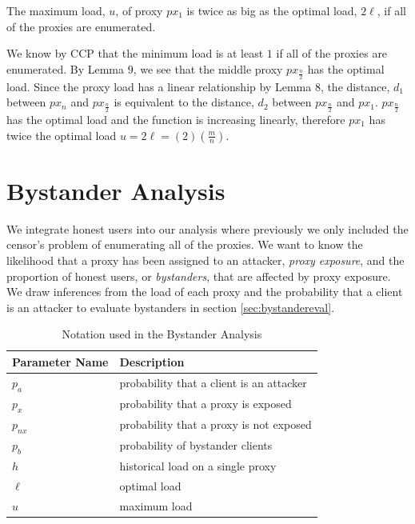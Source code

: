 \begin{theorem}{The maximum load, $u$, of proxy $px_1$ is twice as big as the optimal load, $2\ell$, if all of the proxies are enumerated.}

We know by CCP that the minimum load is at least $1$ if all of the proxies are enumerated. By Lemma $9$, we see that the middle proxy $px_{\frac{n}{2}}$ has the optimal load. Since the proxy load has a linear relationship by Lemma $8$, the distance, $d_1$ between $px_n$ and $px_{\frac{n}{2}}$ is equivalent to the distance, $d_2$ between $px_{\frac{n}{2}}$ and $px_1$. $px_{\frac{n}{2}}$ has the optimal load and the function is increasing linearly, therefore $px_{1}$ has twice the optimal load $u = 2\ell =(2)(\frac{m}{n})$.

\end{theorem}

\section{Bystander Analysis}
\label{sec:bystander}

We integrate honest users into our analysis where previously we only included the censor's problem of enumerating all of the proxies. We want to know the likelihood that a proxy has been assigned to an attacker, \textit{proxy exposure}, and the proportion of honest users, or \textit{bystanders}, that are affected by proxy exposure. We draw inferences from the load of each proxy and the probability that a client is an attacker to evaluate bystanders in section \ref{sec:bystandereval}.

\begin{table}[h]
  \centering
	\begin{tabular}{ll}
	\hline
	\cline{1-2}
	Parameter Name    & Description  \\
	\hline
    $p_a$       & probability that a client is an attacker\\
    $p_x$     & probability that a proxy is exposed \\
    $p_{nx}$     & probability that a proxy is not exposed \\
    $p_b$     & probability of bystander clients\\
	$h$     & historical load on a single proxy  \\
	$\ell$     & optimal load \\
	$u$     & maximum load \\

	\hline
	\end{tabular}
  \caption{Notation used in the Bystander Analysis}
  \label{tab:vars}
\end{table}

